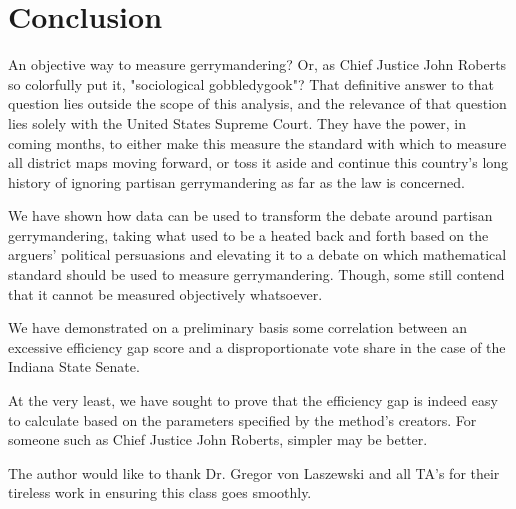 \documentclass[sigconf]{acmart}
\begin{document}
\section{Conclusion}
An objective way to measure gerrymandering? Or, as Chief Justice John Roberts so colorfully put it, "sociological gobbledygook"? That definitive answer to that question lies outside the scope of this analysis, and the relevance of that question lies solely with the United States Supreme Court. They have the power, in coming months, to either make this measure the standard with which to measure all district maps moving forward, or toss it aside and continue this country's long history of ignoring partisan gerrymandering as far as the law is concerned.

We have shown how data can be used to transform the debate around partisan gerrymandering, taking what used to be a heated back and forth based on the arguers' political persuasions and elevating it to a debate on which mathematical standard should be used to measure gerrymandering. Though, some still contend that it cannot be measured objectively whatsoever. 

We have demonstrated on a preliminary basis some correlation between an excessive efficiency gap score and a disproportionate vote share in the case of the Indiana State Senate.

At the very least, we have sought to prove that the efficiency gap is indeed easy to calculate based on the parameters specified by the method's creators. For someone such as Chief Justice John Roberts, simpler may be better.

\begin{acks}

  The author would like to thank Dr. Gregor von Laszewski and all TA's for their tireless work in ensuring this class goes smoothly.

\end{acks}


 

\appendix


\end{document}
